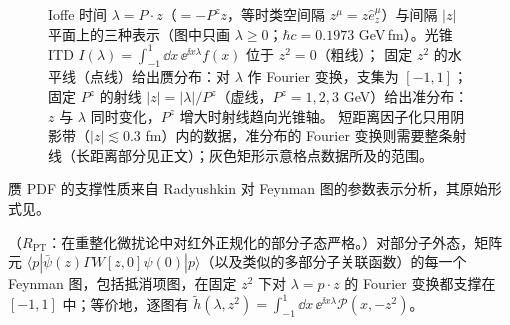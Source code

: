 \begin{figure}[htbp]
\caption{Ioffe 时间 $\lambda=P\cdot z$（$=-P^zz$，等时类空间隔 $z^\mu=z\hat e_z^\mu$）与间隔 $|z|$ 平面上的三种表示（图中只画 $\lambda\ge0$；$\hbar c=0.1973$ GeV\,fm）。光锥 ITD $I(\lambda)=\int_{-1}^1\dd x\,\ee^{\ii x\lambda}f(x)$ 位于 $z^2=0$（粗线）；
固定 $z^2$ 的水平线（点线）给出赝分布：对 $\lambda$ 作 Fourier 变换，支集为 $[-1,1]$；固定 $P^z$ 的射线 $|z|=|\lambda|/P^z$（虚线，$P^z=1,2,3$ GeV）给出准分布：$z$ 与 $\lambda$ 同时变化，$P^z$ 增大时射线趋向光锥轴。
短距离因子化只用阴影带（$|z|\lesssim0.3$ fm）内的数据，准分布的 Fourier 变换则需要整条射线（长距离部分见正文）；灰色矩形示意格点数据所及的范围。}
\label{fig:lamet-ioffe}
\end{figure}
赝 PDF 的支撑性质来自 Radyushkin 对 Feynman 图的参数表示分析\cite{Radyushkin2017,Radyushkin:2018cvn}，其原始形式见\cite{Radyushkin:1983wh}。

\begin{proposition}\label{prop:lamet-support}
（$R_{\mathrm{PT}}$：在重整化微扰论中对红外正规化的部分子态严格。）对部分子外态，矩阵元 $\langle p|\bar\psi(z)\Gamma W[z,0]\psi(0)|p\rangle$（以及类似的多部分子关联函数）的每一个 Feynman 图，包括抵消项图，在固定 $z^2$ 下对 $\lambda=p\cdot z$ 的 Fourier 变换都支撑在 $[-1,1]$ 中；等价地，逐图有 $\tilde h(\lambda,z^2)=\int_{-1}^1\dd x\,\ee^{\ii x\lambda}\mathcal P(x,-z^2)$。%
\end{proposition}

